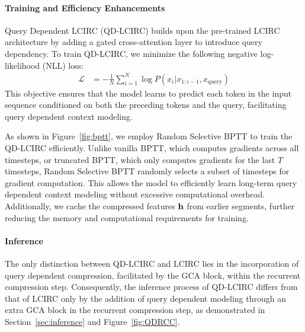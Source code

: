 \paragraph{Training and Efficiency Enhancements}
Query Dependent LCIRC (QD-LCIRC) builds upon the pre-trained LCIRC architecture by adding a gated cross-attention layer to introduce query dependency. To train QD-LCIRC, we minimize the following negative log-likelihood (NLL) loss:
\begin{align}
    \mathcal{L} &= -\frac{1}{N} \sum_{i=1}^{N} \log P(x_i | x_{1:i-1}, x_{\mathrm{query}})
\end{align}
This objective ensures that the model learns to predict each token in the input sequence conditioned on both the preceding tokens and the query, facilitating query dependent context modeling.

As shown in Figure~\ref{fig:bptt}, we employ Random Selective BPTT to train the QD-LCIRC efficiently. Unlike vanilla BPTT, which computes gradients across all timesteps, or truncated BPTT, which only computes gradients for the last $T$ timesteps, Random Selective BPTT randomly selects a subset of timesteps for gradient computation. This allows the model to efficiently learn long-term query dependent context modeling without excessive computational overhead. Additionally, we cache the compressed features $\mathbf{h}$ from earlier segments, further reducing the memory and computational requirements for training.

\paragraph{Inference}
The only distinction between QD-LCIRC and LCIRC lies in the incorporation of query dependent compression, facilitated by the GCA block, within the recurrent compression step. Consequently, the inference process of QD-LCIRC differs from that of LCIRC only by the addition of query dependent modeling through an extra GCA block in the recurrent compression step, as demonstrated in Section~\ref{sec:inference} and Figure~\ref{fig:QDRCC}.

